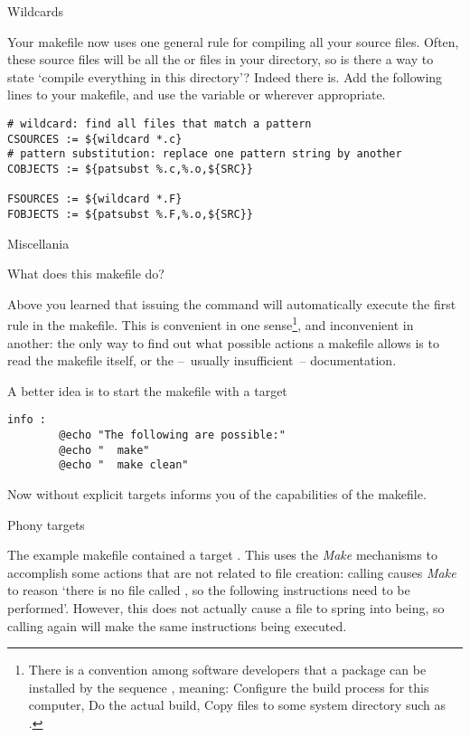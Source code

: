 
 {Wildcards}

Your makefile now uses one general rule for compiling all your source
files. Often, these source files will be all the  or 
files in your directory, so is there a way to state `compile
everything in this directory'? Indeed there is. Add the following lines
to your makefile, and use the variable  or 
wherever appropriate.
\begin{verbatim}
# wildcard: find all files that match a pattern
CSOURCES := ${wildcard *.c}
# pattern substitution: replace one pattern string by another
COBJECTS := ${patsubst %.c,%.o,${SRC}}

FSOURCES := ${wildcard *.F}
FOBJECTS := ${patsubst %.F,%.o,${SRC}}
\end{verbatim}

 {Miscellania}

 {What does this makefile do?}

Above you learned that issuing the  command will automatically
execute the first rule in the makefile. This is convenient in one
sense\footnote {There is a convention among software developers that a
  package can be installed by the sequence , meaning: Configure the build process for this
  computer, Do the actual build, Copy files to some system directory
  such as .}, and inconvenient in another: the only way to
find out what possible actions a makefile allows is to read the
makefile itself, or the --~usually insufficient~-- documentation.

A better idea is to start the makefile with a target
\begin{verbatim}
info :
        @echo "The following are possible:"
        @echo "  make"
        @echo "  make clean"
\end{verbatim}
Now  without explicit targets informs you of the capabilities
of the makefile.

 {Phony targets}

The example makefile contained a target . This uses
the \emph{Make} mechanisms to accomplish some actions that are not
related to file creation: calling  causes \emph{Make} to
reason `there is no file called , so the following
instructions need to be performed'. However, this does not actually
cause a file  to spring into being, so calling 
again will make the same instructions being executed.


